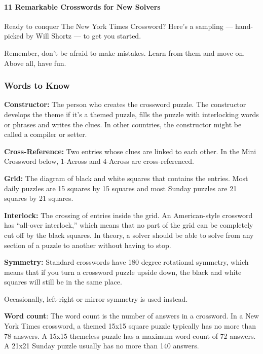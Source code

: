 \hypertarget{11-remarkable-crosswords-for-new-solvers}{%
\paragraph{11 Remarkable Crosswords for New
Solvers}\label{11-remarkable-crosswords-for-new-solvers}}

Ready to conquer The New York Times Crossword? Here's a sampling ---
hand-picked by Will Shortz --- to get you started.

Remember, don't be afraid to make mistakes. Learn from them and move on.
Above all, have fun.~

\hypertarget{words-to-know-1}{%
\subsubsection{Words to Know}\label{words-to-know-1}}

\textbf{Constructor:} The person who creates the crossword puzzle. The
constructor develops the theme if it's a themed puzzle, fills the puzzle
with interlocking words or phrases and writes the clues. In other
countries, the constructor might be called a compiler or setter.

\textbf{Cross-Reference:} Two entries whose clues are linked to each
other. In the Mini Crossword below, 1-Across and 4-Across are
cross-referenced.

\textbf{Grid:} The diagram of black and white squares that contains the
entries. Most daily puzzles are 15 squares by 15 squares and most Sunday
puzzles are 21 squares by 21 squares.

\textbf{Interlock:} The crossing of entries inside the grid. An
American-style crossword has ``all-over interlock,'' which means that no
part of the grid can be completely cut off by the black squares. In
theory, a solver should be able to solve from any section of a puzzle to
another without having to stop.

\textbf{Symmetry:} Standard crosswords have 180 degree rotational
symmetry, which means that if you turn a crossword puzzle upside down,
the black and white squares will still be in the same place.

Occasionally, left-right or mirror symmetry is used instead.

\textbf{Word count}: The word count is the number of answers in a
crossword. In a New York Times crossword, a themed 15x15 square puzzle
typically has no more than 78 answers. A 15x15 themeless puzzle has a
maximum word count of 72 answers. A 21x21 Sunday puzzle usually has no
more than 140 answers.

